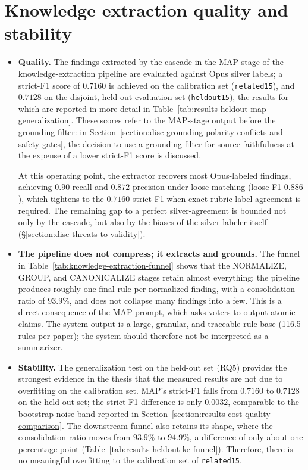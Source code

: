 \section{Knowledge extraction quality and stability}\label{section:disc-knowledge-extraction-quality-and-stability}

\begin{itemize}[label={},leftmargin=1.5em]

    \item \textbf{Quality.} The findings extracted by the cascade in the MAP-stage of the knowledge-extraction pipeline are evaluated against Opus silver labels; a strict-F1 score of $0.7160$ is achieved on the calibration set (\texttt{related15}), and $0.7128$ on the disjoint, held-out evaluation set (\texttt{heldout15}), the results for which are reported in more detail in Table~\ref{tab:results-heldout-map-generalization}. These scores refer to the MAP-stage output before the grounding filter: in Section~\ref{section:disc-grounding-polarity-conflicts-and-safety-gates}, the decision to use a grounding filter for source faithfulness at the expense of a lower strict-F1 score is discussed. 
    
    At this operating point, the extractor recovers most Opus-labeled findings, achieving $0.90$ recall and $0.872$ precision under loose matching (loose-F1 $0.886$), which tightens to the $0.7160$ strict-F1 when exact rubric-label agreement is required. The remaining gap to a perfect silver-agreement is bounded not only by the cascade, but also by the biases of the silver labeler itself (§\ref{section:disc-threats-to-validity}). 
    
    \item \textbf{The pipeline does not compress; it extracts and grounds.} The funnel in Table~\ref{tab:knowledge-extraction-funnel} shows that the NORMALIZE, GROUP, and CANONICALIZE stages retain almost everything: the pipeline produces roughly one final rule per normalized finding, with a consolidation ratio of $93.9\%$, and does not collapse many findings into a few. This is a direct consequence of the MAP prompt, which asks voters to output atomic claims. The system output is a large, granular, and traceable rule base (116.5 rules per paper); the system should therefore not be interpreted as a summarizer. 
    
    \item \textbf{Stability.} The generalization test on the held-out set (RQ5) provides the strongest evidence in the thesis that the measured results are not due to overfitting on the calibration set. MAP's strict-F1 falls from $0.7160$ to $0.7128$ on the held-out set; the strict-F1 difference is only $0.0032$, comparable to the bootstrap noise band reported in Section~\ref{section:results-cost-quality-comparison}. The downstream funnel also retains its shape, where the consolidation ratio moves from $93.9\%$ to $94.9\%$, a difference of only about one percentage point (Table~\ref{tab:results-heldout-ke-funnel}). Therefore, there is no meaningful overfitting to the calibration set of \texttt{related15}. 


\end{itemize}
